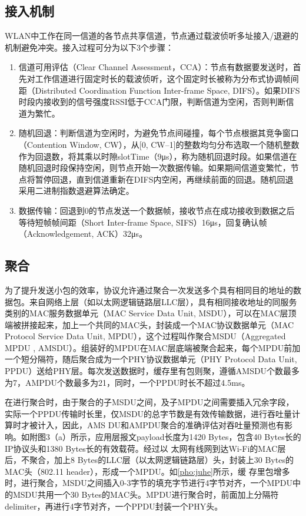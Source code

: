 \documentclass[bwprint]{gmcmthesis}
\begin{document}
\subsection{接入机制}
WLAN中工作在同一信道的各节点共享信道，节点通过载波侦听多址接入/退避的机制避免冲突。接入过程可分为以下3个步骤： 
\begin{enumerate}
    \item 信道可用评估（Clear Channel Assessment，CCA）：节点有数据要发送时，首先对工作信道进行固定时长的载波侦听，这个固定时长被称为分布式协调帧间距（Distributed Coordination Function Inter-frame Space, DIFS）。如果DIFS时段内接收到的信号强度RSSI低于CCA门限，判断信道为空闲，否则判断信道为繁忙。
    \item 随机回退：判断信道为空闲时，为避免节点间碰撞，每个节点根据其竞争窗口（Contention Window, CW），从[0, CW–1]的整数均匀分布选取一个随机整数作为回退数，将其乘以时隙slotTime（9μs），称为随机回退时段。如果信道在随机回退时段保持空闲，则节点开始一次数据传输。如果期间信道变繁忙，节点将暂停回退，直到信道重新在DIFS内空闲，再继续前面的回退。随机回退采用二进制指数退避算法确定。
    \item 数据传输：回退到0的节点发送一个数据帧，接收节点在成功接收到数据之后等待短帧帧间距（Short Inter-frame Space, SIFS）16μs，回复确认帧（Acknowledgement, ACK）32μs。
\end{enumerate}
	

\subsection{聚合}
为了提升发送小包的效率，协议允许通过聚合一次发送多个具有相同目的地址的数据包。来自网络上层（如以太网逻辑链路层LLC层），具有相同接收地址的同服务类别的MAC服务数据单元（MAC Service Data Unit, MSDU），可以在MAC层顶端被拼接起来，加上一个共同的MAC头，封装成一个MAC协议数据单元（MAC Protocol Service Data Unit, MPDU），这个过程叫作聚合MSDU（Aggregated MPDU , AMSDU）。组装好的MPDU在MAC层底端被聚合起来，每个MPDU前加一个短分隔符，随后聚合成为一个PHY协议数据单元（PHY Protocol Data Unit, PPDU）送给PHY层。每次发送数据时，缓存里有包则聚，遵循AMSDU个数最多为7，AMPDU个数最多为21，同时，一个PPDU时长不超过4.5ms。

在进行聚合时，由于聚合的子MSDU之间，及子MPDU之间需要插入冗余字段，实际一个PPDU传输时长里，仅MSDU的总字节数是有效传输数据，进行吞吐量计算时才被计入，因此，AMS
DU和AMPDU聚合的准确评估对吞吐量预测也有影响。如附图3（a）所示，应用层报文payload长度为1420 Bytes，包含40 Bytes长的IP协议头和1380 Bytes长的有效载荷。经过以
太网有线网到达Wi-Fi的MAC层后，不聚合，加上8 Bytes的LLC层（以太网逻辑链路层）头，封装上30 Bytes的MAC头（802.11 header），形成一个MPDU。如\ref{pho:juhe}所示，缓
存里包增多时，进行聚合，MSDU之间插入0-3字节的填充字节进行4字节对齐，一个MPDU中的MSDU共用一个30 Bytes的MAC头。MPDU进行聚合时，前面加上分隔符delimiter，再进行4字节对齐，一个PPDU封装一个PHY头。
\end{document}
